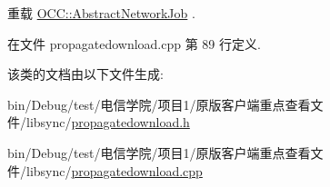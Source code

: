 重载 \hyperlink{class_o_c_c_1_1_abstract_network_job_a256f1b6b5d6f6252e83b3602743da64a}{O\+C\+C\+::\+Abstract\+Network\+Job} .



在文件 propagatedownload.\+cpp 第 89 行定义.



该类的文档由以下文件生成\+:\begin{DoxyCompactItemize}
\item 
bin/\+Debug/test/电信学院/项目1/原版客户端重点查看文件/libsync/\hyperlink{propagatedownload_8h}{propagatedownload.\+h}\item 
bin/\+Debug/test/电信学院/项目1/原版客户端重点查看文件/libsync/\hyperlink{propagatedownload_8cpp}{propagatedownload.\+cpp}\end{DoxyCompactItemize}
